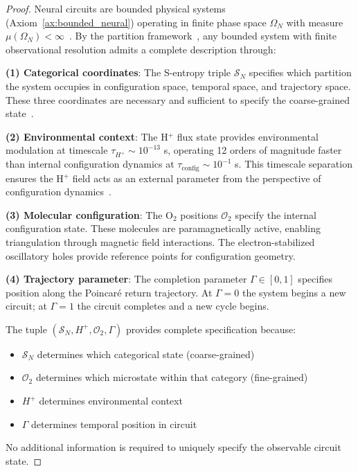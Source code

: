 \documentclass[aps,prd,twocolumn,superscriptaddress,floatfix,nofootinbib]{revtex4-2}
\theoremstyle{remark}
\begin{document}
\begin{proof}
Neural circuits are bounded physical systems (Axiom~\ref{ax:bounded_neural}) operating in finite phase space $\Omega_N$ with measure $\mu(\Omega_N) < \infty$~\cite{landau1980statistical}. By the partition framework~\cite{sachikonye2025partition}, any bounded system with finite observational resolution admits a complete description through:

\textbf{(1) Categorical coordinates}: The S-entropy triple $\mathcal{S}_N$ specifies which partition the system occupies in configuration space, temporal space, and trajectory space. These three coordinates are necessary and sufficient to specify the coarse-grained state~\cite{cover2006elements}.

\textbf{(2) Environmental context}: The H$^+$ flux state provides environmental modulation at timescale $\tau_{H^+} \sim 10^{-13}$ s, operating 12 orders of magnitude faster than internal configuration dynamics at $\tau_{\text{config}} \sim 10^{-1}$ s. This timescale separation ensures the H$^+$ field acts as an external parameter from the perspective of configuration dynamics~\cite{callen1985thermodynamics}.

\textbf{(3) Molecular configuration}: The O$_2$ positions $\mathcal{O}_2$ specify the internal configuration state. These molecules are paramagnetically active, enabling triangulation through magnetic field interactions. The electron-stabilized oscillatory holes provide reference points for configuration geometry.

\textbf{(4) Trajectory parameter}: The completion parameter $\Gamma \in [0,1]$ specifies position along the Poincaré return trajectory. At $\Gamma = 0$ the system begins a new circuit; at $\Gamma = 1$ the circuit completes and a new cycle begins.

The tuple $(\mathcal{S}_N, H^+, \mathcal{O}_2, \Gamma)$ provides complete specification because:
\begin{itemize}
\item $\mathcal{S}_N$ determines which categorical state (coarse-grained)
\item $\mathcal{O}_2$ determines which microstate within that category (fine-grained)
\item $H^+$ determines environmental context
\item $\Gamma$ determines temporal position in circuit
\end{itemize}

No additional information is required to uniquely specify the observable circuit state.
\end{proof}
\end{document}
